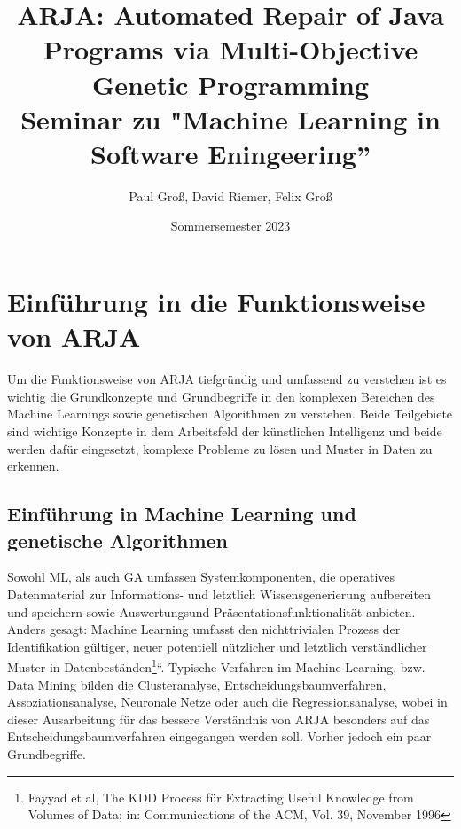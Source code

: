 \documentclass[11pt,a4paper]{article}
\title{ARJA: Automated Repair of Java Programs via
Multi-Objective Genetic Programming \\[0.5em] \large{Seminar zu "Machine Learning in Software Eningeering'' \\[0.5em]} }
\author{Paul Groß, David Riemer, Felix Groß}
\date{Sommersemester 2023}
\begin{document}
\maketitle

\section{Einführung in die Funktionsweise von ARJA}
Um die Funktionsweise von ARJA tiefgründig und umfassend zu verstehen ist es wichtig die Grundkonzepte und Grundbegriffe in den komplexen Bereichen des Machine Learnings sowie genetischen Algorithmen zu verstehen. Beide Teilgebiete sind wichtige Konzepte in dem Arbeitsfeld der künstlichen Intelligenz und beide werden dafür eingesetzt, komplexe Probleme zu lösen und Muster in Daten zu erkennen. 
\subsection{Einführung in Machine Learning und genetische Algorithmen}
Sowohl ML, als auch GA umfassen Systemkomponenten, die operatives Datenmaterial zur Informations- und letztlich Wissensgenerierung aufbereiten und speichern sowie Auswertungsund Präsentationsfunktionalität anbieten. Anders gesagt: Machine Learning umfasst den nichttrivialen Prozess der Identifikation gültiger, neuer potentiell nützlicher und letztlich verständlicher Muster in Datenbeständen\footnote{Fayyad et al, The KDD Process für Extracting Useful Knowledge from Volumes of Data; in: Communications of the ACM, Vol. 39, November 1996
}“. Typische Verfahren im Machine Learning, bzw. Data Mining bilden die Clusteranalyse, Entscheidungsbaumverfahren, Assoziationsanalyse, Neuronale Netze oder auch die Regressionsanalyse, wobei in dieser Ausarbeitung für das bessere Verständnis von ARJA besonders auf das Entscheidungsbaumverfahren eingegangen werden soll. Vorher jedoch ein paar Grundbegriffe.\\ 
\end{document}
